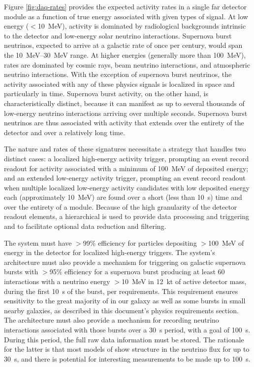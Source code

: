 Figure \ref{fig:daq-rates} provides the expected activity rates in a
single far detector module as a function of true energy associated
with given types of signal.
At low energy ($<$\SI{10}{\MeV}), activity is dominated by radiological backgrounds
intrinsic to the detector and
low-energy solar neutrino interactions. Supernova burst neutrinos,
expected to arrive at a galactic  rate of once per century, 
would span the \SIrange{10}{30}{\MeV} range. At higher energies (generally
more than \SI{100}{\MeV}), rates are dominated by cosmic rays, beam neutrino interactions,
and atmospheric neutrino interactions. With the exception of supernova
burst neutrinos, the activity associated with any of these physics
signals is localized in space and particularly in time. Supernova burst
activity, on the other hand, is characteristically distinct, because it can
manifest as up to several thousands of low-energy neutrino interactions
arriving over multiple seconds. Supernova burst neutrinos
are thus associated with activity that extends over the entirety of the
detector and over a relatively long time.

The nature and rates of these signatures necessitate a  strategy that handles two
distinct cases: a localized high-energy activity trigger, prompting an event record readout for
activity associated with a minimum of \SI{100}{\MeV} of deposited energy; and an extended low-energy
activity trigger, prompting an event record readout when multiple localized low-energy activity
candidates with low deposited energy each (approximately \SI{10}{\MeV}) are found over a short (less than
\SI{10}{\second}) time and over the entirety of a \nominalmodsize  module. Because of the high
granularity of the detector readout elements, a hierarchical  is used to
provide data processing and triggering and to facilitate optional data reduction and filtering. 

The   system must have $>$99\% efficiency for particles
depositing $>$\SI{100}{\MeV} of energy in the detector for localized
high-energy triggers. The system's architecture must also provide a 
mechanism for triggering on galactic supernova bursts with $>$95\%
efficiency for a supernova burst producing at least 60 
interactions with a neutrino energy $>$\SI{10}{\MeV} in 12~kt of active
detector mass, during the first \SI{10}{\second} of the burst, per
 requirements. This requirement ensures sensitivity to the
great majority of  in our galaxy as well as some bursts in small
nearby galaxies, as described in this document's  physics requirements
section. The  architecture must also provide a mechanism for recording
neutrino interactions associated with those bursts over a \SI{30}{\second}
period, with a goal of \SI{100}{\second}. During this period, the full raw
data information must be stored. The rationale for the latter is that most
models of  show structure in the neutrino flux for up to
\SI{30}{\second}, and there is potential for interesting measurements to be made
up to \SI{100}{\second}.

